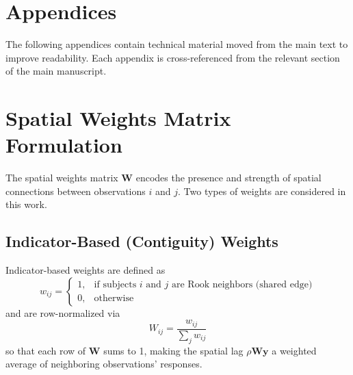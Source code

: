 \documentclass{article}[11pt]
\begin{document}

\clearpage
\appendix
\renewcommand{\thesection}{\Alph{section}}

\section*{Appendices}
\vspace{0.5em}
\noindent The following appendices contain technical material moved from the main text to improve readability. Each appendix is cross-referenced from the relevant section of the main manuscript.
\vspace{1em}

\section{Spatial Weights Matrix Formulation}\label{appendix:SpatialWeights}

The spatial weights matrix $\mathbf{W}$ encodes the presence and strength of spatial connections between observations $i$ and $j$. Two types of weights are considered in this work.

\subsection*{Indicator-Based (Contiguity) Weights}

Indicator-based weights are defined as
\begin{equation}
    w_{ij} =
    \begin{cases}
        1, & \text{if subjects $i$ and $j$ are Rook neighbors (shared edge)}\\
        0, & \text{otherwise}
    \end{cases}
\end{equation}
and are row-normalized via
\begin{equation}
    W_{ij} = \frac{w_{ij}}{\displaystyle\sum_{j} w_{ij}}
\end{equation}
so that each row of $\mathbf{W}$ sums to 1, making the spatial lag $\rho\mathbf{Wy}$ a weighted average of neighboring observations' responses.
\end{document}
